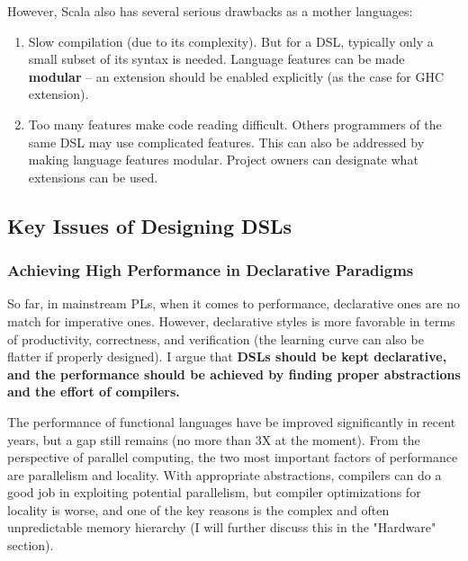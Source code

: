 \documentclass[11pt]{article}
\begin{document}
However, Scala also has several serious drawbacks as a mother languages:
\begin{enumerate}
    \item Slow compilation (due to its complexity).
    But for a DSL, typically only a small subset of its syntax is needed.
    Language features can be made \textbf{modular} -- an extension should be enabled explicitly (as the case for GHC extension).
    \item Too many features make code reading difficult.
    Others programmers of the same DSL may use complicated features.
    This can also be addressed by making language features modular.
    Project owners can designate what extensions can be used.
\end{enumerate}
\subsection{Key Issues of Designing DSLs}
\subsubsection*{Achieving High Performance in Declarative Paradigms}
So far, in mainstream PLs, when it comes to performance, declarative ones are no match for imperative ones.
However, declarative styles is more favorable in terms of productivity, correctness, and verification (the learning curve can also be flatter if properly designed).
I argue that \textbf{DSLs should be kept declarative, and the performance should be achieved by finding proper abstractions and the effort of compilers.}

The performance of functional languages have be improved significantly in recent years, but a gap still remains (no more than 3X at the moment).
From the perspective of parallel computing, the two most important factors of performance are parallelism and locality.
With appropriate abstractions, compilers can do a good job in exploiting potential parallelism, but compiler optimizations for locality is worse, and one of the key reasons is the complex and often unpredictable memory hierarchy (I will further discuss this in the "Hardware" section).
\end{document}
